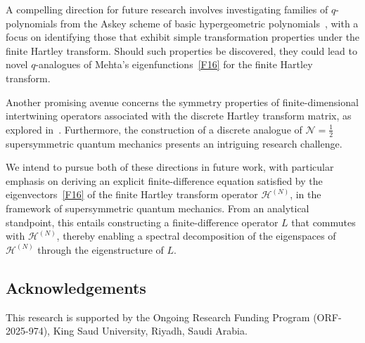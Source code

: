 \documentclass[12 pt]{amsart}
\numberwithin{equation}{section}
\begin{document}
A compelling direction for future research involves investigating families of \( q \)-polynomials from the Askey scheme of basic hypergeometric polynomials~\cite{AS}, with a focus on identifying those that exhibit simple transformation properties under the finite Hartley transform. Should such properties be discovered, they could lead to novel \( q \)-analogues of Mehta’s eigenfunctions~\eqref{F16} for the finite Hartley transform.

Another promising avenue concerns the symmetry properties of finite-dimensional intertwining operators associated with the discrete Hartley transform matrix, as explored in~\cite{Mehta,Matv,MesNat,AA2016}. Furthermore, the construction of a discrete analogue of \( \mathcal{N} = \tfrac{1}{2} \) supersymmetric quantum mechanics presents an intriguing research challenge.

We intend to pursue both of these directions in future work, with particular emphasis on deriving an explicit finite-difference equation satisfied by the eigenvectors~\eqref{F16} of the finite Hartley transform operator \( \mathcal{H}^{(N)} \), in the framework of supersymmetric quantum mechanics. From an analytical standpoint, this entails constructing a finite-difference operator \( L \) that commutes with \( \mathcal{H}^{(N)} \), thereby enabling a spectral decomposition of the eigenspaces of \( \mathcal{H}^{(N)} \) through the eigenstructure of \( L \).

\subsection*{Acknowledgements}
This research is supported by the Ongoing Research Funding Program (ORF-2025-974), King Saud University, Riyadh, Saudi Arabia.





\medskip
\end{document}

